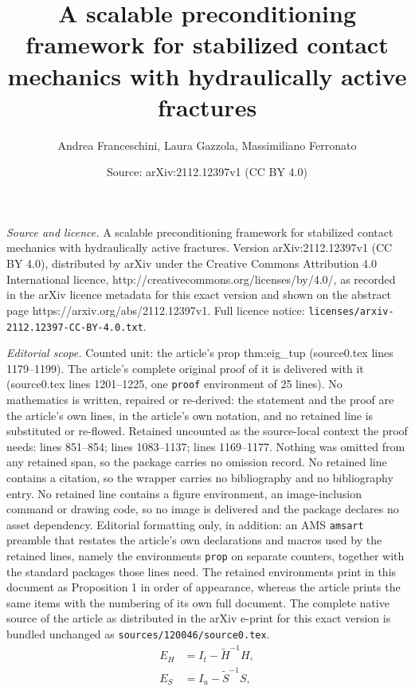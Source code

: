 \documentclass[10pt,a4paper]{amsart}
\title{A scalable preconditioning framework for stabilized contact mechanics with hydraulically active fractures}
\author{Andrea Franceschini, Laura Gazzola, Massimiliano Ferronato}
\date{Source: arXiv:2112.12397v1 (CC BY 4.0)}
\newcommand{\tH}{\widetilde{H}}
\newcommand{\tS}{\widetilde{S}}
\begin{document}
\maketitle

\noindent\emph{Source and licence.} A scalable preconditioning framework for stabilized contact mechanics with hydraulically active fractures. Version arXiv:2112.12397v1 (CC BY 4.0), distributed by arXiv under the Creative Commons Attribution 4.0 International licence, http://creativecommons.org/licenses/by/4.0/, as recorded in the arXiv licence metadata for this exact version and shown on the abstract page https://arxiv.org/abs/2112.12397v1. Full licence notice: \texttt{licenses/arxiv-2112.12397-CC-BY-4.0.txt}.\par\smallskip

\noindent\textit{Editorial scope.} Counted unit: the article's prop thm:eig\_tup (source0.tex lines 1179--1199). The article's complete original proof of it is delivered with it (source0.tex lines 1201--1225, one \texttt{proof} environment of 25 lines). No mathematics is written, repaired or re-derived: the statement and the proof are the article's own lines, in the article's own notation, and no retained line is substituted or re-flowed.  Retained uncounted as the source-local context the proof needs: lines 851--854; lines 1083--1137; lines 1169--1177.  Nothing was omitted from any retained span, so the package carries no omission record.  No retained line contains a citation, so the wrapper carries no bibliography and no bibliography entry.  No retained line contains a figure environment, an image-inclusion command or drawing code, so no image is delivered and the package declares no asset dependency.  Editorial formatting only, in addition: an AMS \texttt{amsart} preamble that restates the article's own declarations and macros used by the retained lines, namely the environments \texttt{prop} on separate counters, together with the standard packages those lines need.  The retained environments print in this document as Proposition 1 in order of appearance, whereas the article prints the same items with the numbering of its own full document.  The complete native source of the article as distributed in the arXiv e-print for this exact version is bundled unchanged as \texttt{sources/120046/source0.tex}.
\begin{align}
    E_H &= I_t - \tH^{-1} H, \label{eq:EH} \\
    E_S &= I_u - \tS^{-1} S, \label{eq:ES}
\end{align}
\end{document}
